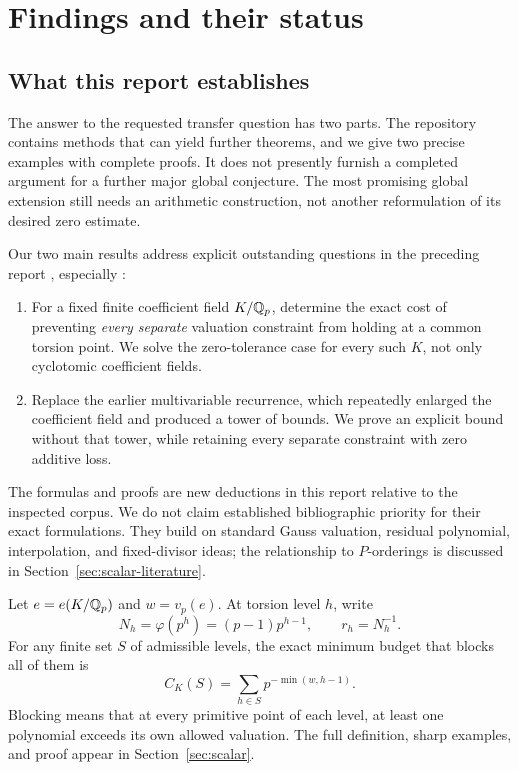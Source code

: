 \section{Findings and their status}
\label{sec:findings}

\subsection{What this report establishes}
The answer to the requested transfer question has two parts. The repository contains methods that can yield further theorems, and we give two precise examples with complete proofs. It does not presently furnish a completed argument for a further major global conjecture. The most promising global extension still needs an arithmetic construction, not another reformulation of its desired zero estimate.

Our two main results address explicit outstanding questions in the preceding report , especially :
\begin{enumerate}
\item For a fixed finite coefficient field $K/\mathbb Q_p$, determine the exact cost of preventing \emph{every separate} valuation constraint from holding at a common torsion point. We solve the zero-tolerance case for every such $K$, not only cyclotomic coefficient fields.
\item Replace the earlier multivariable recurrence, which repeatedly enlarged the coefficient field and produced a tower of bounds. We prove an explicit bound without that tower, while retaining every separate constraint with zero additive loss.
\end{enumerate}
The formulas and proofs are new deductions in this report relative to the inspected corpus. We do not claim established bibliographic priority for their exact formulations. They build on standard Gauss valuation, residual polynomial, interpolation, and fixed-divisor ideas; the relationship to $P$-orderings is discussed in Section~\ref{sec:scalar-literature}.

Let $e=e(K/\mathbb Q_p)$ and $w=v_p(e)$. At torsion level $h$, write
\[
N_h=\varphi(p^h)=(p-1)p^{h-1},
\qquad r_h=N_h^{-1}.
\]
For any finite set $S$ of admissible levels, the exact minimum budget that blocks all of them is
\begin{equation}
\boxed{\ C_K(S)=\sum_{h\in S}p^{-\min(w,h-1)}.\ }
\label{eq:executive-scalar}
\end{equation}
Blocking means that at every primitive point of each level, at least one polynomial exceeds its own allowed valuation. The full definition, sharp examples, and proof appear in Section~\ref{sec:scalar}.

